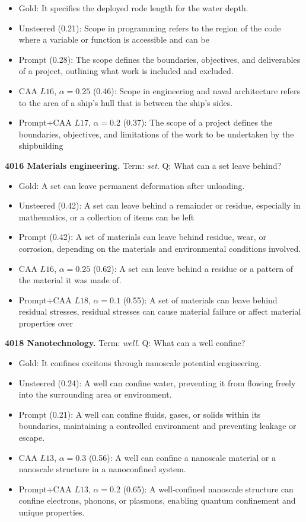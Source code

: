 \begin{itemize}\setlength{\itemsep}{0.15em}\setlength{\parsep}{0pt}\setlength{\topsep}{0.2em}
\item Gold: It specifies the deployed rode length for the water depth.
\item Unsteered (0.21): Scope in programming refers to the region of the code where a variable or function is accessible and can be
\item Prompt (0.28): The scope defines the boundaries, objectives, and deliverables of a project, outlining what work is included and excluded.
\item CAA $L16$, $\alpha=0.25$ (0.46): Scope in engineering and naval architecture refers to the area of a ship's hull that is between the ship's sides.
\item Prompt+CAA $L17$, $\alpha=0.2$ (0.37): The scope of a project defines the boundaries, objectives, and limitations of the work to be undertaken by the shipbuilding
\end{itemize}
\medskip\noindent\textbf{4016 Materials engineering.} Term: \emph{set}.
Q: What can a set leave behind?
\begin{itemize}\setlength{\itemsep}{0.15em}\setlength{\parsep}{0pt}\setlength{\topsep}{0.2em}
\item Gold: A set can leave permanent deformation after unloading.
\item Unsteered (0.42): A set can leave behind a remainder or residue, especially in mathematics, or a collection of items can be left
\item Prompt (0.42): A set of materials can leave behind residue, wear, or corrosion, depending on the materials and environmental conditions involved.
\item CAA $L16$, $\alpha=0.25$ (0.62): A set can leave behind a residue or a pattern of the material it was made of.
\item Prompt+CAA $L18$, $\alpha=0.1$ (0.55): A set of materials can leave behind residual stresses, residual stresses can cause material failure or affect material properties over
\end{itemize}
\medskip\noindent\textbf{4018 Nanotechnology.} Term: \emph{well}.
Q: What can a well confine?
\begin{itemize}\setlength{\itemsep}{0.15em}\setlength{\parsep}{0pt}\setlength{\topsep}{0.2em}
\item Gold: It confines excitons through nanoscale potential engineering.
\item Unsteered (0.24): A well can confine water, preventing it from flowing freely into the surrounding area or environment.
\item Prompt (0.21): A well can confine fluids, gases, or solids within its boundaries, maintaining a controlled environment and preventing leakage or escape.
\item CAA $L13$, $\alpha=0.3$ (0.56): A well can confine a nanoscale material or a nanoscale structure in a nanoconfined system.
\item Prompt+CAA $L13$, $\alpha=0.2$ (0.65): A well-confined nanoscale structure can confine electrons, phonons, or plasmons, enabling quantum confinement and unique properties.
\end{itemize}
